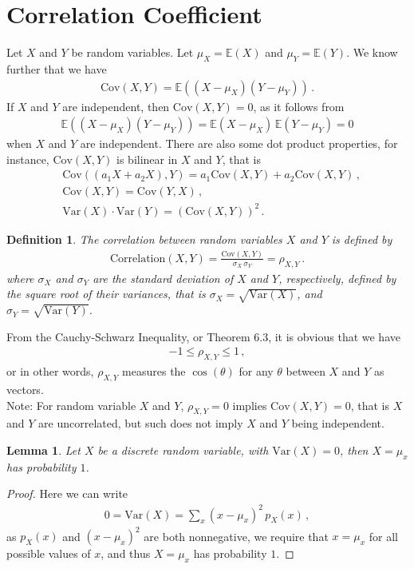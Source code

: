 \documentclass[11pt, onesided]{book}
\theoremstyle{break}
\theoremstyle{break}
\newtheorem{lem}{Lemma}[thm]
\newtheorem{defn}{Definition}[thm]
\newcommand{\note}{\color{red}Note: \color{black}}
\begin{document}
\section[Correlation]{\color{red} Correlation Coefficient \color{black}}
Let $X$ and $Y$ be random variables. Let $\mu_X= \mathbb{E}(X)$ and $\mu_Y = \mathbb{E}(Y)$. We know further that we have
\begin{align*}
\text{Cov}(X,Y) = \mathbb{E}((X - \mu_X) (Y-\mu_Y))\,.
\end{align*}
If $X$ and $Y$ are independent, then $\text{Cov}(X,Y) = 0$, as it follows from
\begin{align*}
\mathbb{E}((X - \mu_X) (Y-\mu_Y)) = \mathbb{E}(X - \mu_X)\, \mathbb{E}(Y-\mu_Y) = 0
\end{align*}
when $X$ and $Y$ are independent. There are also some dot product properties, for instance, $\text{Cov}(X,Y)$ is bilinear in $X$ and $Y$, that is
\begin{align*}
&\text{Cov}((a_1X+a_2X),Y) = a_1\text{Cov}(X,Y) + a_2 \text{Cov}(X,Y)\,,\\
&\text{Cov}(X,Y)= \text{Cov}(Y,X)\,, \\
&\text{Var}(X) \cdot \text{Var}(Y)= (\text{Cov}(X,Y))^2\,.
\end{align*}
\begin{defn}
The correlation between random variables $X$ and $Y$ is defined by
\begin{align*}
\text{Correlation}(X,Y) = \frac{\text{Cov}(X,Y)}{\sigma_X\, \sigma_Y} = \rho_{X,Y}\,.
\end{align*}
where $\sigma_X$ and $\sigma_Y$ are the standard deviation of $X$ and $Y$, respectively, defined by the square root of their variances, that is $\sigma_X = \sqrt{\text{Var}(X)}$, and $\sigma_Y = \sqrt{\text{Var}(Y)}$.
\end{defn}
From the Cauchy-Schwarz Inequality, or Theorem 6.3, it is obvious that we have
\begin{align*}
-1\leq \rho_{X,Y} \leq 1\,,
\end{align*}
or in other words, $\rho_{X,Y}$ measures the $\cos(\theta)$ for any $\theta$ between $X$ and $Y$ as vectors. \\

\note For random variable $X$ and $Y$, $\rho_{X,Y} = 0$ implies $\text{Cov}(X,Y) = 0$, that is $X$ and $Y$ are uncorrelated, but such does not imply $X$ and $Y$ being independent. 

\begin{lem}
Let $X$ be a discrete random variable, with $\text{Var}(X) = 0$, then $X = \mu_x$ has probability $1$. 
\end{lem}
\begin{proof}
Here we can write
\begin{align*}
0 = \text{Var}(X) = \sum_{x}(x-\mu_x)^2\, p_X(x)\,,
\end{align*}
as $p_X(x)$ and $(x-\mu_x)^2$ are both nonnegative, we require that $x = \mu_x$ for all possible values of $x$, and thus $X = \mu_x$ has probability $1$. 
\end{proof}
\end{document}
